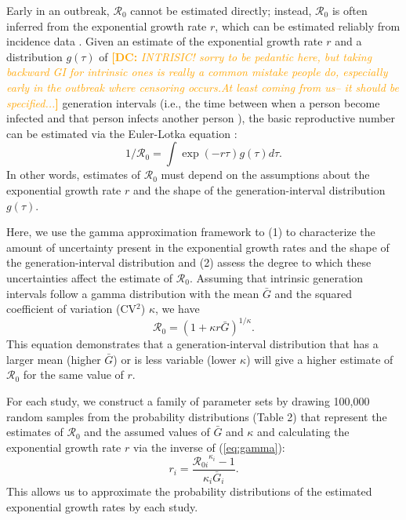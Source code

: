 \documentclass[12pt]{article}
\newcommand{\eref}[1]{(\ref{eq:#1})}
\newcommand{\comment}[3]{\textcolor{#1}{\textbf{[#2: }\textsl{#3}\textbf{]}}}
\newcommand{\dc}[1]{\comment{Orange}{DC}{#1}}
\begin{document}
Early in an outbreak, $\mathcal R_0$ cannot be estimated directly;
instead, $\mathcal R_0$ is often inferred from
the exponential growth rate $r$, which can be estimated reliably from incidence data \citep{mills2004transmissibility, nishiura2009transmission, ma2014estimating}.
Given an estimate of the exponential growth rate $r$ and a distribution $g(\tau)$ of
\dc{INTRISIC! sorry to be pedantic here, but taking backward GI for intrinsic ones is really a common mistake people do, especially early in the outbreak where censoring occurs.At  least coming from us-- it should be specified...} generation intervals (i.e., the time between when a person become 
infected and that person infects another person \citep{svensson2007note}), the basic reproductive
number can be estimated via the Euler-Lotka equation \citep{wallinga2007generation}:
\begin{equation}
1/\mathcal R_0 = \int \exp(-r\tau) g(\tau) d\tau.
\end{equation}
In other words, estimates of $\mathcal R_0$ must
depend on the assumptions about the
exponential growth rate $r$ and the shape of the generation-interval distribution $g(\tau)$.

Here, we use the gamma approximation framework \citep{mcbryde2009early, nishiura2009transmission, roberts2011early, park2019practical} to (1) to characterize the amount of uncertainty present in the exponential growth rates and the shape of the generation-interval distribution and (2) assess the degree to which these uncertainties affect the estimate of $\mathcal R_0$.
Assuming that intrinsic generation intervals follow a gamma distribution
with the mean $\bar G$ and the squared coefficient of variation (CV$^2$) $\kappa$, 
we have
\begin{equation}
\mathcal R_0 = \left(1 + \kappa r \bar{G}\right)^{1/\kappa}.
\label{eq:gamma}
\end{equation}
This equation demonstrates that a generation-interval distribution
that has a larger mean (higher $\bar{G}$) or is less variable (lower $\kappa$)
will give a higher estimate of $\mathcal R_0$ for the same value of $r$.

For each study, we construct a family of parameter sets by drawing 100,000 random samples from the probability distributions (Table 2) that represent the estimates of $\mathcal R_0$ and the assumed values of $\bar G$ and $\kappa$ and calculating the exponential growth rate $r$ via the inverse of \eref{gamma}:
\begin{equation}
r_i = \frac{{\mathcal R_{0i}}^{\kappa_i} - 1}{\kappa_i \bar{G}_i}.
\end{equation}
This allows us to approximate the probability distributions of the estimated exponential growth rates by each study.
\end{document}
